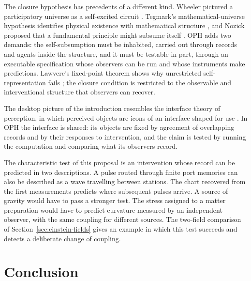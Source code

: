 \documentclass[11pt]{article}
\theoremstyle{definition}
\theoremstyle{remark}
\begin{document}
The closure hypothesis has precedents of a different kind. Wheeler pictured
a participatory universe as a self-excited circuit \cite{wheeler1983}.
Tegmark's mathematical-universe hypothesis identifies physical existence with
mathematical structure \cite{tegmark2008}, and Nozick proposed that a
fundamental principle might subsume itself \cite{nozick1981}. OPH adds two
demands: the self-subsumption must be inhabited, carried out through records
and agents inside the structure, and it must be testable in part, through an
executable specification whose observers can be run and whose instruments
make predictions. Lawvere's fixed-point theorem shows why unrestricted
self-representation fails \cite{lawvere1969}; the closure condition is
restricted to the observable and interventional structure that observers can
recover.

The desktop picture of the introduction resembles the interface theory of
perception, in which perceived objects are icons of an interface shaped
for use \cite{hoffman2015}. In OPH the interface is shared: its objects are
fixed by agreement of overlapping records and by their responses to
intervention, and the claim is tested by running the computation and
comparing what its observers record.

The characteristic test of this proposal is an intervention whose
record can be predicted in two descriptions. A pulse routed through
finite port memories can also be described as a wave travelling between
stations. The chart recovered from the first measurements predicts
where subsequent pulses arrive. A source of gravity would have to pass a
stronger test. The stress assigned to a matter preparation would have
to predict curvature measured by an independent observer, with the
same coupling for different sources. The two-field comparison of
Section~\ref{sec:einstein-fields} gives an example in which this test
succeeds and detects a deliberate change of coupling.

\section{Conclusion}
\end{document}
